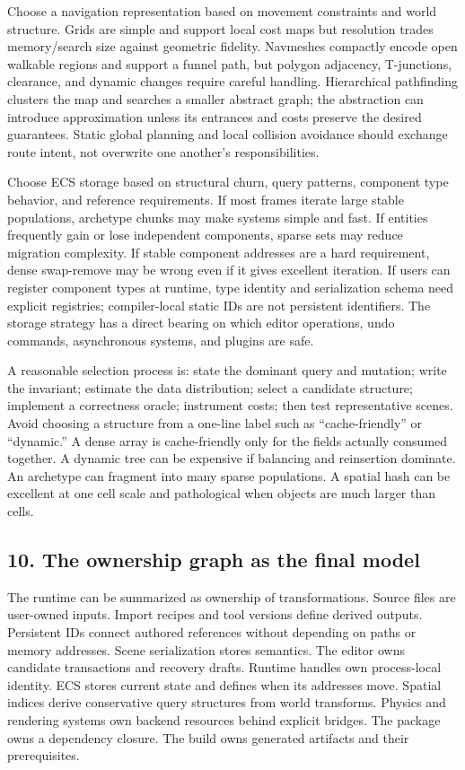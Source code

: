 Choose a navigation representation based on movement constraints and world structure. Grids are simple and support local cost maps but resolution trades memory/search size against geometric fidelity. Navmeshes compactly encode open walkable regions and support a funnel path, but polygon adjacency, T-junctions, clearance, and dynamic changes require careful handling. Hierarchical pathfinding clusters the map and searches a smaller abstract graph; the abstraction can introduce approximation unless its entrances and costs preserve the desired guarantees. Static global planning and local collision avoidance should exchange route intent, not overwrite one another's responsibilities.

Choose ECS storage based on structural churn, query patterns, component type behavior, and reference requirements. If most frames iterate large stable populations, archetype chunks may make systems simple and fast. If entities frequently gain or lose independent components, sparse sets may reduce migration complexity. If stable component addresses are a hard requirement, dense swap-remove may be wrong even if it gives excellent iteration. If users can register component types at runtime, type identity and serialization schema need explicit registries; compiler-local static IDs are not persistent identifiers. The storage strategy has a direct bearing on which editor operations, undo commands, asynchronous systems, and plugins are safe.

A reasonable selection process is: state the dominant query and mutation; write the invariant; estimate the data distribution; select a candidate structure; implement a correctness oracle; instrument costs; then test representative scenes. Avoid choosing a structure from a one-line label such as ``cache-friendly'' or ``dynamic.'' A dense array is cache-friendly only for the fields actually consumed together. A dynamic tree can be expensive if balancing and reinsertion dominate. An archetype can fragment into many sparse populations. A spatial hash can be excellent at one cell scale and pathological when objects are much larger than cells.

\subsection{10. The ownership graph as the final model}\label{05-engine-i-ch008-the-ownership-graph-as-the-final-model}

The runtime can be summarized as ownership of transformations. Source files are user-owned inputs. Import recipes and tool versions define derived outputs. Persistent IDs connect authored references without depending on paths or memory addresses. Scene serialization stores semantics. The editor owns candidate transactions and recovery drafts. Runtime handles own process-local identity. ECS stores current state and defines when its addresses move. Spatial indices derive conservative query structures from world transforms. Physics and rendering systems own backend resources behind explicit bridges. The package owns a dependency closure. The build owns generated artifacts and their prerequisites.

